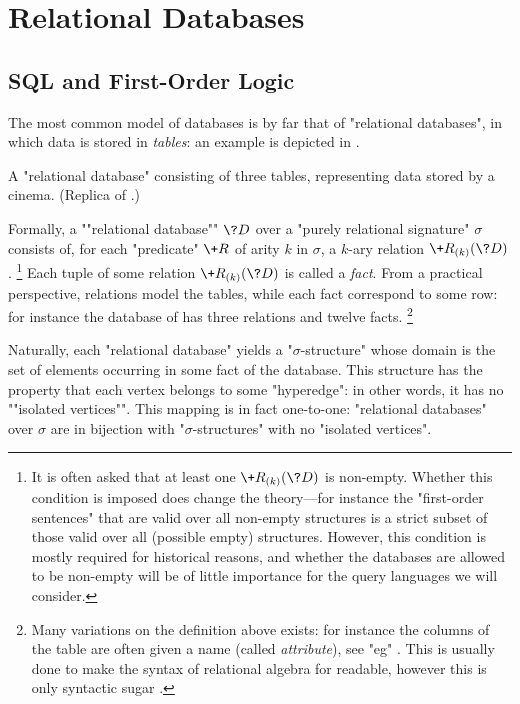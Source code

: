 \section{Relational Databases}

\subsection{SQL and First-Order Logic}

The most common model of databases is by far that of "relational databases",
in which data is stored in \emph{tables}: an example is depicted
in .

\begin{table}
	\centering%
	
	\caption{
		\AP\label{fig:relational-database-cinema}
		A "relational database" consisting of three tables, representing data
		stored by a cinema. (Replica of .)
	}
\end{table}

Formally, a \AP""relational database"" $\?D$ over a "purely relational signature" $\sigma$
consists of, for each "predicate" $\+R$ of arity $k$ in $\sigma$,
a $k$-ary relation $\+R_{(k)}(\?D)$.%
\footnote{It is often asked that at least one $\+R_{(k)}(\?D)$ is non-empty.
Whether this condition is imposed does change the theory---for instance the "first-order sentences"
that are valid over all non-empty structures is a strict subset of
those valid over all (possible empty) structures.
However, this condition is mostly required for historical reasons,
and whether the databases are allowed to be non-empty
will be of little importance for the query languages we will consider.}
Each tuple of some relation $\+R_{(k)}(\?D)$ is called a \emph{fact}.
From a practical perspective, relations model the tables,
while each fact correspond to some row: for 
instance the database of 
has three relations and twelve facts.%
\footnote{Many variations on the definition above exists:
for instance the columns of the table are often given a name (called \emph{attribute}),
see "eg" \cite[\S\!\S~3.1--3.2]{AbiteboulHullVianu1995Databases}.
This is usually done to make the syntax of relational algebra for readable,
however this is only syntactic sugar \cite[Proposition~5.1.2]{AbiteboulHullVianu1995Databases}.}

Naturally, each "relational database" yields a "$\sigma$-structure" whose
domain is the set of elements occurring in some fact of the database.
This structure has the property that each vertex belongs to some "hyperedge":
in other words, it has no \AP""isolated vertices"".
This mapping is in fact one-to-one: "relational databases" over $\sigma$
are in bijection with "$\sigma$-structures" with no "isolated vertices".

